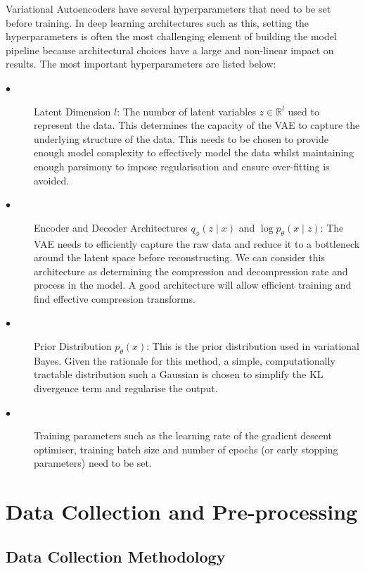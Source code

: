 \documentclass{mldsmsc}
\begin{document}
Variational Autoencoders have several hyperparameters that need to be set before training. In deep learning architectures such as this, setting the hyperparameters is often the most challenging element of building the model pipeline because architectural choices have a large and non-linear impact on results. The most important hyperparameters are listed below: 
\begin{description}
	\item [$\bullet$]Latent Dimension $l$: The number of latent variables $z \in \mathbb{R}^l$ used to represent the data. This determines the capacity of the VAE to capture the underlying structure of the data. This needs to be chosen to provide enough model complexity to effectively model the data whilst maintaining enough parsimony to impose regularisation and ensure over-fitting is avoided. 
	
	\item [$\bullet$]Encoder and Decoder Architectures \(q_\phi({z}\mid{x})\) and $\log p_\theta({x}\mid{z})$:  The VAE needs to efficiently capture the raw data and reduce it to a bottleneck around the latent space before reconstructing. We can consider this architecture as determining the compression and decompression rate and process in the model. A good architecture will allow efficient training and find effective compression transforms.
	
	\item [$\bullet$]Prior Distribution $p_\theta({x})$: This is the prior distribution used in variational Bayes. Given the rationale for this method, a simple, computationally tractable distribution such a Gaussian is chosen to simplify the KL divergence term and regularise the output.
	
	\item [$\bullet$]Training parameters such as the learning rate of the gradient descent optimiser, training batch size and number of epochs (or early stopping parameters) need to be set.
	
\end{description}
\chapter{Data Collection and Pre-processing}\label{sec:data_collection_and_preproc}


\section{Data Collection Methodology}
\end{document}
